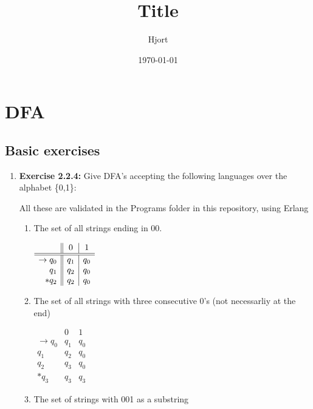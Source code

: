 \documentclass{article}
\title{Title}
\date{\today}
\author{Hjort}
\begin{document}
\maketitle

\section*{DFA}
\subsection*{Basic exercises}

\begin{enumerate}
    \item \textbf{Exercise 2.2.4:} Give DFA's accepting the following languages over the alphabet \{0,1\}:

        All these are validated in the Programs folder in this repository, using Erlang

        \begin{enumerate}
            \item The set of all strings ending in $00$.

                $
                \begin{array}{r || c | c}
                        & 0 & 1 \\ \hline \hline
                    \to q_0 & q_1 & q_0 \\
                        q_1 & q_2 & q_0\\
                        *q_2 & q_2 & q_0
                \end{array}
                $

            \item The set of all strings with three consecutive 0's (not necessarliy at the end)

                $ \begin{array}{r||c|c}
                            & 0 & 1 \\ \hline \hline
                    \to q_0 & q_1 & q_0 \\
                    q_1 & q_2 & q_0 \\
                    q_2 & q_3 & q_0 \\
                    *q_3 & q_3 & q_3
                \end{array}
                $

            \item The set of strings with 001 as a substring


\end{enumerate}
\end{enumerate}
\end{document}
